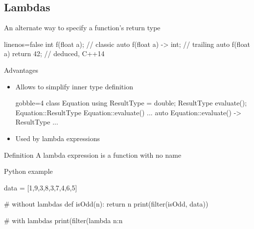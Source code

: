 \subsection[$\lambda$]{Lambdas}

\begin{frame}[fragile]
  \begin{block}{An alternate way to specify a function's return type}
    \begin{cppcode*}{linenos=false}
      int f(float a);                // classic
      auto f(float a) -> int;        // trailing
      auto f(float a) { return 42; } // deduced, C++14
    \end{cppcode*}
  \end{block}
  \pause
  \begin{block}{Advantages}
    \begin{itemize}
    \item Allows to simplify inner type definition
      \begin{cppcode*}{gobble=4}
        class Equation {
          using ResultType = double;
          ResultType evaluate();
        }
        Equation::ResultType Equation::evaluate() {...}
        auto Equation::evaluate() -> ResultType {...}
      \end{cppcode*}
    \item Used by lambda expressions
    \end{itemize}
  \end{block}
\end{frame}


\begin{frame}[fragile]
  \begin{block}{Definition}
    A lambda expression is a function with no name
  \end{block}
  \pause
  \begin{exampleblock}{Python example}
    \begin{pythoncode*}{}
      data = [1,9,3,8,3,7,4,6,5]

      # without lambdas
      def isOdd(n):
        return n%
      print(filter(isOdd, data))

      # with lambdas
      print(filter(lambda n:n%
    \end{pythoncode*}
  \end{exampleblock}
\end{frame}

